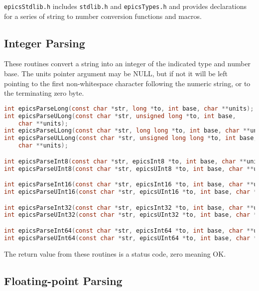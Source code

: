 \verb|epicsStdlib.h| includes \verb|stdlib.h| and \verb|epicsTypes.h| and provides declarations for a series of string to number conversion functions and macros.

\subsection{Integer Parsing}

These routines convert a string into an integer of the indicated type and number base.
The units pointer argument may be NULL, but if not it will be left pointing to the first non-whitespace character following the numeric string, or to the terminating zero byte.

\begin{lstlisting}[language=C]
int epicsParseLong(const char *str, long *to, int base, char **units);
int epicsParseULong(const char *str, unsigned long *to, int base,
    char **units);
int epicsParseLLong(const char *str, long long *to, int base, char **units);
int epicsParseULLong(const char *str, unsigned long long *to, int base,
    char **units);

int epicsParseInt8(const char *str, epicsInt8 *to, int base, char **units);
int epicsParseUInt8(const char *str, epicsUInt8 *to, int base, char **units);

int epicsParseInt16(const char *str, epicsInt16 *to, int base, char **units);
int epicsParseUInt16(const char *str, epicsUInt16 *to, int base, char **units);

int epicsParseInt32(const char *str, epicsInt32 *to, int base, char **units);
int epicsParseUInt32(const char *str, epicsUInt32 *to, int base, char **units);

int epicsParseInt64(const char *str, epicsInt64 *to, int base, char **units);
int epicsParseUInt64(const char *str, epicsUInt64 *to, int base, char **units);
\end{lstlisting}

The return value from these routines is a status code, zero meaning OK.

\subsection{Floating-point Parsing}

